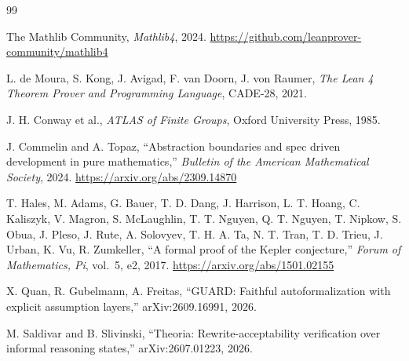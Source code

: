 \documentclass[11pt]{ctexart}
\begin{document}
\begin{thebibliography}{99}

The Mathlib Community,
\emph{Mathlib4}, 2024.
\url{https://github.com/leanprover-community/mathlib4}

L. de Moura, S. Kong, J. Avigad, F. van Doorn,
J. von Raumer,
\emph{The Lean 4 Theorem Prover and Programming Language},
CADE-28, 2021.

J. H. Conway et al.,
\emph{ATLAS of Finite Groups},
Oxford University Press, 1985.

J. Commelin and A. Topaz,
``Abstraction boundaries and spec driven development
in pure mathematics,''
\emph{Bulletin of the American Mathematical Society}, 2024.
\url{https://arxiv.org/abs/2309.14870}

T. Hales, M. Adams, G. Bauer, T. D. Dang, J. Harrison,
L. T. Hoang, C. Kaliszyk, V. Magron, S. McLaughlin,
T. T. Nguyen, Q. T. Nguyen, T. Nipkow, S. Obua,
J. Pleso, J. Rute, A. Solovyev, T. H. A. Ta,
N. T. Tran, T. D. Trieu, J. Urban, K. Vu, R. Zumkeller,
``A formal proof of the Kepler conjecture,''
\emph{Forum of Mathematics, Pi}, vol.~5, e2, 2017.
\url{https://arxiv.org/abs/1501.02155}

X. Quan, R. Gubelmann, A. Freitas,
``GUARD: Faithful autoformalization with explicit
assumption layers,''
arXiv:2609.16991, 2026.

M. Saldivar and B. Slivinski,
``Theoria: Rewrite-acceptability verification over
informal reasoning states,''
arXiv:2607.01223, 2026.

\end{thebibliography}
\end{document}
